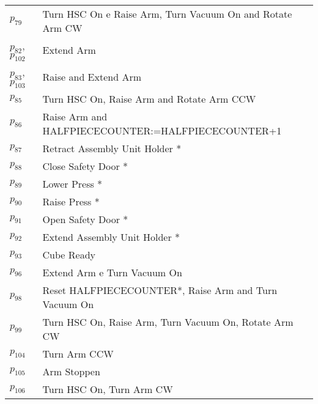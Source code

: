 \begin{longtable}{M{5cm}M{10cm}}
\hyperlink{completeNet:p79}{\hypertarget{completeTable:p79}{$p_{79}$}} & Turn HSC On e Raise Arm, Turn Vacuum On and Rotate Arm CW\\
\hyperlink{completeNet:p82}{\hypertarget{completeTable:p82}{$p_{82}$}}, \hyperlink{completeNet:p102}{\hypertarget{completeTable:p102}{$p_{102}$}} & Extend Arm\\
\hyperlink{completeNet:p83}{\hypertarget{completeTable:p83}{$p_{83}$}}, \hyperlink{completeNet:p103}{\hypertarget{completeTable:p103}{$p_{103}$}} & Raise and Extend Arm\\
\hyperlink{completeNet:p85}{\hypertarget{completeTable:p85}{$p_{85}$}} & Turn HSC On, Raise Arm and Rotate Arm CCW\\
\hyperlink{completeNet:p86}{\hypertarget{completeTable:p86}{$p_{86}$}} & Raise Arm and HALFPIECECOUNTER:=HALFPIECECOUNTER+1\\
\hyperlink{completeNet:p87}{\hypertarget{completeTable:p87}{$p_{87}$}} & Retract Assembly Unit Holder *\\
\hyperlink{completeNet:p88}{\hypertarget{completeTable:p88}{$p_{88}$}} & Close Safety Door *\\
\hyperlink{completeNet:p89}{\hypertarget{completeTable:p89}{$p_{89}$}} & Lower Press *\\
\hyperlink{completeNet:p90}{\hypertarget{completeTable:p90}{$p_{90}$}} & Raise Press *\\
\hyperlink{completeNet:p91}{\hypertarget{completeTable:p91}{$p_{91}$}} & Open Safety Door *\\
\hyperlink{completeNet:p92}{\hypertarget{completeTable:p92}{$p_{92}$}} & Extend Assembly Unit Holder *\\
\hyperlink{completeNet:p93}{\hypertarget{completeTable:p93}{$p_{93}$}} & Cube Ready\\
\hyperlink{completeNet:p96}{\hypertarget{completeTable:p96}{$p_{96}$}} & Extend Arm e Turn Vacuum On\\
\hyperlink{completeNet:p98}{\hypertarget{completeTable:p98}{$p_{98}$}} & Reset HALFPIECECOUNTER*, Raise Arm and Turn Vacuum On\\
\hyperlink{completeNet:p99}{\hypertarget{completeTable:p99}{$p_{99}$}} & Turn HSC On, Raise Arm, Turn Vacuum On, Rotate Arm CW\\
\hyperlink{completeNet:p104}{\hypertarget{completeTable:p104}{$p_{104}$}} & Turn Arm CCW\\
\hyperlink{completeNet:p105}{\hypertarget{completeTable:p105}{$p_{105}$}} & Arm Stoppen\\
\hyperlink{completeNet:p106}{\hypertarget{completeTable:p106}{$p_{106}$}} & Turn HSC On, Turn Arm CW\\

\end{longtable}
